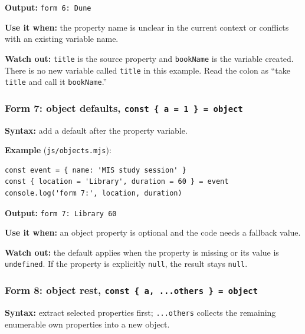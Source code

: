 \documentclass[
]{article}
\newcommand{\passthrough}[1]{#1}
\begin{document}
\textbf{Output:} \passthrough{\lstinline!form 6: Dune!}

\textbf{Use it when:} the property name is unclear in the current
context or conflicts with an existing variable name.

\textbf{Watch out:} \passthrough{\lstinline!title!} is the source
property and \passthrough{\lstinline!bookName!} is the variable created.
There is no new variable called \passthrough{\lstinline!title!} in this
example. Read the colon as ``take \passthrough{\lstinline!title!} and
call it \passthrough{\lstinline!bookName!}.''

\subsubsection{\texorpdfstring{Form 7: object defaults,
\texttt{const\ \{\ a\ =\ 1\ \}\ =\ object}}{Form 7: object defaults, const \{ a = 1 \} = object}}\label{form-7-object-defaults-const--a--1---object}

\textbf{Syntax:} add a default after the property variable.

\textbf{Example} (\passthrough{\lstinline!js/objects.mjs!}):

\begin{lstlisting}
const event = { name: 'MIS study session' }
const { location = 'Library', duration = 60 } = event
console.log('form 7:', location, duration)
\end{lstlisting}

\textbf{Output:} \passthrough{\lstinline!form 7: Library 60!}

\textbf{Use it when:} an object property is optional and the code needs
a fallback value.

\textbf{Watch out:} the default applies when the property is missing or
its value is \passthrough{\lstinline!undefined!}. If the property is
explicitly \passthrough{\lstinline!null!}, the result stays
\passthrough{\lstinline!null!}.

\subsubsection{\texorpdfstring{Form 8: object rest,
\texttt{const\ \{\ a,\ ...others\ \}\ =\ object}}{Form 8: object rest, const \{ a, ...others \} = object}}\label{form-8-object-rest-const--a-others---object}

\textbf{Syntax:} extract selected properties first;
\passthrough{\lstinline!...others!} collects the remaining enumerable
own properties into a new object.
\end{document}
